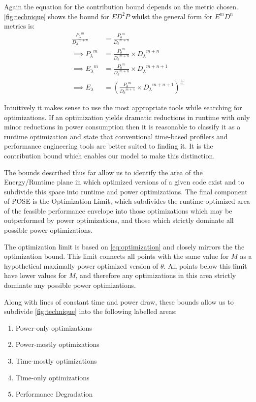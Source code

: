 Again the equation for the contribution bound depends on the metric chosen. 
\autoref{fig:technique} shows the bound for $ED^2P$ whilst the general form for $E^mD^n$ metrics is:
\begin{align}
\frac{{P_{\lambda}}^m}{{D_{\lambda}}^{m+n}} &= \frac{{P_{\theta}}^m}{{D_{\theta}}^{m+n}} \nonumber \\
\implies {P_{\lambda}}^m &= \frac{{P_{\theta}}^m}{{D_{\theta}}^{m+n}} \times {D_\lambda}^{m+n} \nonumber \\ 
\implies {E_{\lambda}}^m &= \frac{{P_{\theta}}^m}{{D_{\theta}}^{m+n}} \times {D_\lambda}^{m+n+1} \nonumber \\ 
\implies E_{\lambda} &= (\frac{{P_{\theta}}^m}{{D_{\theta}}^{m+n}} \times {D_\lambda}^{m+n+1})^{\frac{1}{m}} 
\end{align}

Intuitively it makes sense to use the most appropriate tools while searching for optimizations.  If an optimization yields dramatic reductions in runtime with only minor reductions in power consumption then it is reasonable to classify it as a runtime optimization and state that conventional time-based profilers and performance engineering tools are better suited to finding it. It is the contribution bound which enables our model to make this distinction.

The bounds described thus far allow us to identify the area of the Energy/Runtime plane in which optimized versions of a given code exist and to subdivide this space into runtime and power optimizations. The final component of POSE is the Optimization Limit, which subdivides the runtime optimized area of the feasible performance envelope into those optimizations which may be outperformed by power optimizations, and those which strictly dominate all possible power optimizations.

The optimization limit is based on \autoref{eq:optimization} and closely mirrors the the optimization bound.
This limit connects all points with the same value for $M$ as a hypothetical maximally power optimized version of $\theta$. 
All points below this limit have lower values for $M$, and therefore any optimizations in this area strictly dominate any possible power optimizations. 

Along with lines of constant time and power draw, these bounds allow us to subdivide \autoref{fig:technique} into the following labelled areas:
\begin{enumerate}
\item Power-only optimizations
\item Power-mostly optimizations
\item Time-mostly optimizations
\item Time-only optimizations
\item Performance Degradation
\end{enumerate}

